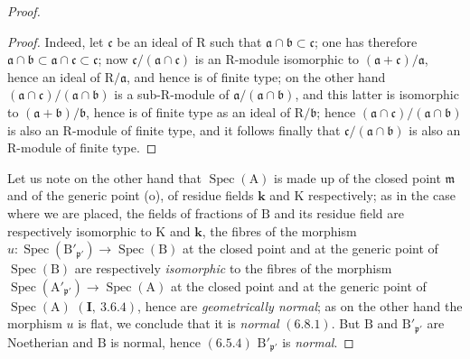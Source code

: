 \begin{proof}
\begin{proof}
Indeed, let $\mathfrak{c}$ be an ideal of $\mathrm{R}$ such that $\mathfrak{a}\cap\mathfrak{b}\subset\mathfrak{c}$; one has therefore $\mathfrak{a}\cap\mathfrak{b}\subset\mathfrak{a}\cap\mathfrak{c}\subset\mathfrak{c}$; now
$\mathfrak{c}/(\mathfrak{a}\cap\mathfrak{c})$ is an $\mathrm{R}$-module isomorphic to $(\mathfrak{a}+\mathfrak{c})/\mathfrak{a}$, hence an ideal of $\mathrm{R}/\mathfrak{a}$, and hence
is of finite type; on the other hand $(\mathfrak{a}\cap\mathfrak{c})/(\mathfrak{a}\cap\mathfrak{b})$ is a sub-$\mathrm{R}$-module of $\mathfrak{a}/(\mathfrak{a}\cap\mathfrak{b})$, and
this latter is isomorphic to $(\mathfrak{a}+\mathfrak{b})/\mathfrak{b}$, hence is of finite type as an ideal of $\mathrm{R}/\mathfrak{b}$;
hence $(\mathfrak{a}\cap\mathfrak{c})/(\mathfrak{a}\cap\mathfrak{b})$ is also an $\mathrm{R}$-module of finite type, and it follows finally that
$\mathfrak{c}/(\mathfrak{a}\cap\mathfrak{b})$ is also an $\mathrm{R}$-module of finite type.
\end{proof}

Let us note on the other hand that $\operatorname{Spec}(\mathrm{A})$ is made up of the closed point $\mathfrak{m}$ and of the generic
point (o), of residue fields $\boldsymbol{k}$ and $\mathrm{K}$ respectively; as in the case where we
are placed, the fields of fractions of $\mathrm{B}$ and its residue field are respectively
isomorphic to $\mathrm{K}$ and $\boldsymbol{k}$, the fibres of the morphism $u:\operatorname{Spec}(\mathrm{B}'_{\mathfrak{p}'})\to\operatorname{Spec}(\mathrm{B})$ at the closed point
and at the generic point of $\operatorname{Spec}(\mathrm{B})$ are respectively \emph{isomorphic} to the fibres of the morphism
$\operatorname{Spec}(\mathrm{A}'_{\mathfrak{p}'})\to\operatorname{Spec}(\mathrm{A})$ at the closed point and at the generic point of $\operatorname{Spec}(\mathrm{A})$ $(\mathbf{I},~3.6.4)$, hence
are \emph{geometrically normal}; as on the other hand the morphism $u$ is flat,
we conclude that it is \emph{normal} $(6.8.1)$. But $\mathrm{B}$ and $\mathrm{B}'_{\mathfrak{p}'}$ are Noetherian and $\mathrm{B}$ is normal, hence
$(6.5.4)$ $\mathrm{B}'_{\mathfrak{p}'}$ is \emph{normal}.


\end{proof}
